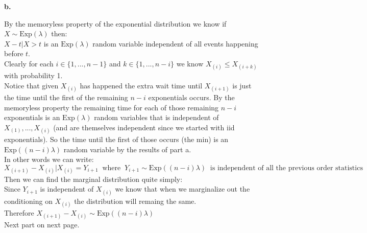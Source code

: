 \documentclass{article}
\begin{document}
\newpage
{\Large\textbf{b.}}
\begin{center}
\doublespacing
    By the memoryless property of the exponential distribution we know if $X\sim\mbox{Exp}(\lambda)$ then:
    \\$X - t| X > t$ is an $\mbox{Exp}(\lambda)$ random variable independent of all events happening before $t$.
    \\Clearly for each $i\in\{1, ..., n-1\}$ and $k\in\{1, ..., n-i\}$ we know $X_{(i)}\leq X_{(i+k)}$ with probability 1.
    \\Notice that given $X_{(i)}$ has happened the extra wait time until $X_{(i+1)}$ is just the time until the first of the remaining $n - i$ exponentials occurs. By the memoryless property the remaining time for each of those remaining $n - i$ exponentials is an $\mbox{Exp}(\lambda)$ random variables that is independent of $X_{(1)}, ..., X_{(i)}$ (and are themselves independent since we started with iid exponentials). So the time until the first of those occurs (the min) is an $\mbox{Exp}((n - i)\lambda)$ random variable by the results of part a.
    \\In other words we can write:
    \[X_{(i+1)} - X_{(i)} | X_{(i)} = Y_{i+1}\;\;\mbox{where}\;\; Y_{i+1}\sim\mbox{Exp}((n-i)\lambda)\;\;\mbox{is independent of all the previous order statistics}\]
    Then we can find the marginal distribution quite simply:
    \\Since $Y_{i+1}$ is independent of $X_{(i)}$ we know that when we marginalize out the conditioning on $X_{(i)}$ the distribution will remaing the same.
    \\Therefore $X_{(i+1)} - X_{(i)}\sim\mbox{Exp}((n-i)\lambda)$
    \vspace{2in}
    \\Next part on next page.
\end{center}
\end{document}
